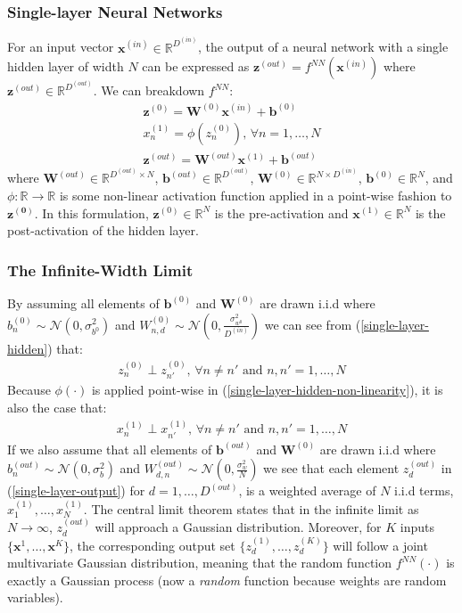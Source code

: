 \documentclass[twoside,11pt]{article}
\begin{document}
\subsubsection{Single-layer Neural Networks}
For an input vector $\mathbf{x}^{(in)} \in \mathbb{R}^{D^{(in)}}$, the output of a neural network with a single hidden layer of width $N$ can be expressed as $\mathbf{z}^{(out)} = f^{NN}\left(\mathbf{x}^{(in)}\right)$ where $\mathbf{z}^{(out)} \in \mathbb{R}^{D^{(out)}}$. We can breakdown $f^{NN}$:
\begin{align}
    \label{single-layer-hidden}
    \mathbf{z}^{(0)} = \mathbf{W}^{(0)} \mathbf{x}^{(in)} + \mathbf{b}^{(0)}\\
    \label{single-layer-hidden-non-linearity}
    x_n^{(1)} = \phi(z_n^{(0)})\text{, } \forall n = 1, \dots, N\\
    \label{single-layer-output}
    \mathbf{z}^{(out)} = \mathbf{W}^{(out)} \mathbf{x}^{(1)} + \mathbf{b}^{(out)}
\end{align}
where $\mathbf{W}^{(out)} \in \mathbb{R}^{D^{(out)} \times N}$, $\mathbf{b}^{(out)} \in \mathbb{R}^{D^{(out)}}$,  $\mathbf{W}^{(0)} \in \mathbb{R}^{N \times D^{(in)}}$, $\mathbf{b}^{(0)} \in \mathbb{R}^{N}$, and $\phi: \mathbb{R} \rightarrow \mathbb{R}$ is some non-linear activation function applied in a point-wise fashion to $\mathbf{z^{(0)}}$. In this formulation, $\mathbf{z}^{(0)} \in \mathbb{R}^N$ is the pre-activation and $\mathbf{x}^{(1)}  \in \mathbb{R}^N$ is the post-activation of the hidden layer.
\subsubsection{The Infinite-Width Limit}
By assuming all elements of $\mathbf{b}^{(0)}$ and $\mathbf{W}^{(0)}$ are drawn i.i.d where $b^{(0)}_n \sim \mathcal{N}(0, \sigma_{b^{0}}^2)$ and $W^{(0)}_{n, d} \sim \mathcal{N}(0, \frac{\sigma_{w^{0}}^2}{D^{(in)}})$ we can see from (\ref{single-layer-hidden}) that:
\begin{align}
    z_{n}^{(0)} \perp z_{n'}^{(0)} \text{, } \forall n \neq n' \text{ and } n, n' = 1, \dots, N
\end{align}
Because $\phi(\cdot)$ is applied point-wise in (\ref{single-layer-hidden-non-linearity}), it is also the case that:
\begin{align}
    x_{n}^{(1)} \perp x_{n'}^{(1)} \text{, } \forall n \neq n' \text{ and } n, n' = 1, \dots, N
\end{align}
If we also assume that all elements of $\mathbf{b}^{(out)}$ and $\mathbf{W}^{(0)}$ are drawn i.i.d where $b^{(out)}_n \sim \mathcal{N}(0, \sigma_b^2)$ and $W^{(out)}_{d, n} \sim \mathcal{N}(0, \frac{\sigma_{w}^2}{N})$ we see that each element $z_d^{(out)}$ in (\ref{single-layer-output}) for $d=1, \dots, D^{(out)}$, is a weighted average of $N$ i.i.d terms, $x_1^{(1)}, \dots, x_N^{(1)}$. The central limit theorem states that in the infinite limit as $N \rightarrow \infty$, $z_d^{(out)}$ will approach a Gaussian distribution. Moreover, for $K$ inputs $\{\textbf{x}^1, \dots, \textbf{x}^K\}$, the corresponding output set $\{z_d^{(1)}, \dots, z_d^{(K)}\}$ will follow a joint multivariate Gaussian distribution, meaning that the random function $f^{NN}(\cdot)$ is exactly a Gaussian process (now a \textit{random} function because weights are random variables).
\end{document}
